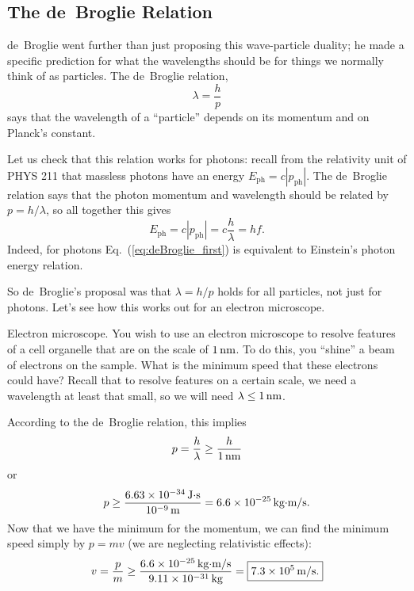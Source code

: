 \subsection{The de~Broglie Relation}

de~Broglie went further than just proposing this wave-particle
duality; he made a specific prediction for what the wavelengths
should be for things we normally think of as particles.  The 
de~Broglie relation,
\begin{equation}
\lambda = \frac{h}{p}
\label{eq:deBroglie_first}
\end{equation}
says that the wavelength of a ``particle'' depends on its momentum and
on Planck's constant.

Let us check that this relation works for photons: recall from the
relativity unit of PHYS 211 that massless photons have an energy
$E_\text{ph} = c|p_\text{ph}|$.  The de~Broglie relation says that the
photon momentum and wavelength should be related by $p=h/\lambda$, so
all together this gives
\begin{equation}
E_\text{ph} = c |p_\text{ph}| = c\frac{h}{\lambda} = hf.
\end{equation}
Indeed, for photons Eq.~(\ref{eq:deBroglie_first}) is equivalent to
Einstein's photon energy relation.

So de~Broglie's proposal was that $\lambda=h/p$ holds for all
particles, not just for photons.  Let's see how this works out for an
electron microscope.

\begin{example}{Electron microscope.}
You wish to use an electron microscope to resolve features of a cell
organelle that are on the scale of $1\,\mbox{nm}$.  To do this, you
``shine'' a beam of electrons on the sample.  What is the minimum
speed that these electrons could have?  \solution Recall that to
resolve features on a certain scale, we need a wavelength at least
that small, so we will need $\lambda \leq 1\,\mbox{nm}$.

According to the de~Broglie relation, this implies
\begin{equation}
  p = \frac{h}{\lambda} \geq \frac{h}{1\,\mbox{nm}}  
\end{equation}
or
\begin{equation}
  p \geq \frac{6.63\times 10^{-34}\,\mbox{J$\cdot$s}}{10^{-9}\,\mbox{m}}
  = 6.6\times 10^{-25}\,\mbox{kg$\cdot$m/s}.
\end{equation}
Now that we have the minimum for the momentum, we can find the 
minimum speed simply by $p=mv$ (we are neglecting relativistic
effects):
\begin{equation}
  v = \frac{p}{m} \geq \frac{6.6\times 10^{-25}\,\mbox{kg$\cdot$m/s}}
  {9.11\times 10^{-31}\,\mbox{kg}} = \boxed{7.3\times 10^5\,\mbox{m/s}.}
\end{equation}
\end{example}

